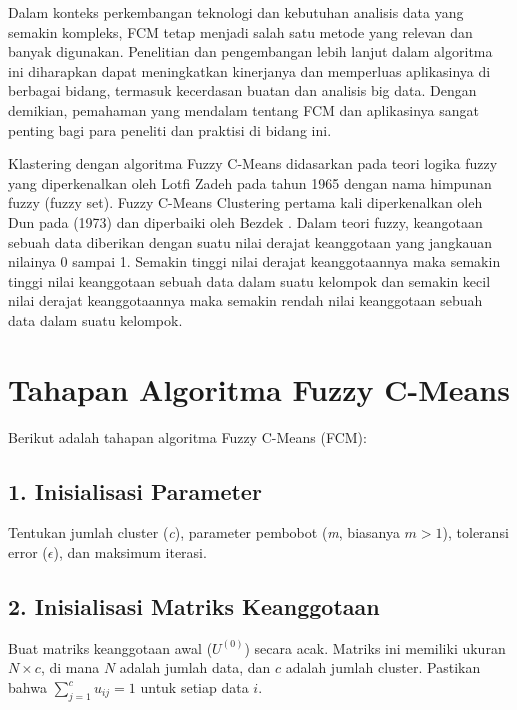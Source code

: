 \documentclass[
  oneside]{book}
\begin{document}
Dalam konteks perkembangan teknologi dan kebutuhan analisis data yang semakin kompleks, FCM tetap menjadi salah satu metode yang relevan dan banyak digunakan. Penelitian dan pengembangan lebih lanjut dalam algoritma ini diharapkan dapat meningkatkan kinerjanya dan memperluas aplikasinya di berbagai bidang, termasuk kecerdasan buatan dan analisis big data. Dengan demikian, pemahaman yang mendalam tentang FCM dan aplikasinya sangat penting bagi para peneliti dan praktisi di bidang ini.

Klastering dengan algoritma Fuzzy C-Means didasarkan pada teori logika fuzzy yang diperkenalkan oleh Lotfi Zadeh pada tahun 1965 dengan nama himpunan fuzzy (fuzzy set). Fuzzy C-Means Clustering pertama kali diperkenalkan oleh Dun pada (1973) dan diperbaiki oleh Bezdek \citep{bezdek1981pattern} . Dalam teori fuzzy, keangotaan sebuah data diberikan dengan suatu nilai derajat keanggotaan yang jangkauan nilainya 0 sampai 1. Semakin tinggi nilai derajat keanggotaannya maka semakin tinggi nilai keanggotaan sebuah data dalam suatu kelompok dan semakin kecil nilai derajat keanggotaannya maka semakin rendah nilai keanggotaan sebuah data dalam suatu kelompok.

\section{Tahapan Algoritma Fuzzy C-Means}\label{tahapan-algoritma-fuzzy-c-means}

Berikut adalah tahapan algoritma Fuzzy C-Means (FCM):

\subsection*{1. Inisialisasi Parameter}\label{inisialisasi-parameter}

Tentukan jumlah cluster (\emph{c}), parameter pembobot (\emph{m}, biasanya \(m > 1\)), toleransi error (\(\epsilon\)), dan maksimum iterasi.

\subsection*{2. Inisialisasi Matriks Keanggotaan}\label{inisialisasi-matriks-keanggotaan}

Buat matriks keanggotaan awal (\(U^{(0)}\)) secara acak. Matriks ini memiliki ukuran \(N \times c\), di mana \(N\) adalah jumlah data, dan \(c\) adalah jumlah cluster. Pastikan bahwa \(\sum_{j=1}^c u_{ij} = 1\) untuk setiap data \(i\).
\end{document}
